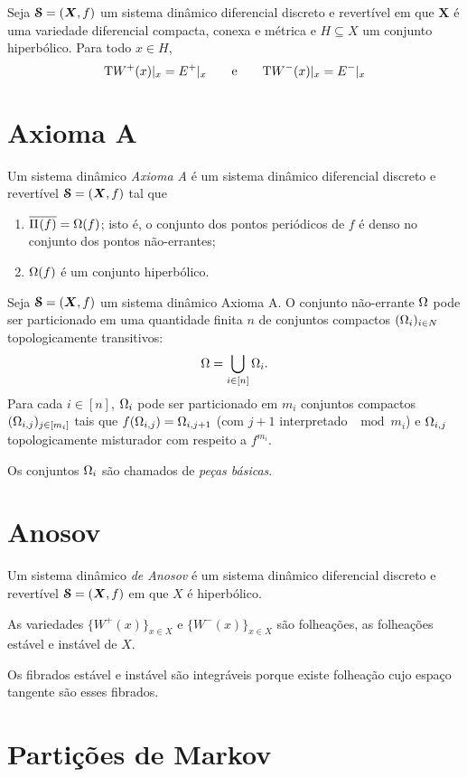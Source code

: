 \begin{proposition}
Seja $\bm{\mathcal{S}} = (\bm X,f)$ um sistema dinâmico diferencial discreto e revertível em que $\bm X$ é uma variedade diferencial compacta, conexa e métrica e $H \subseteq X$ um conjunto hiperbólico. Para todo $x \in H$,
	\begin{equation*}
	\mathrm{T} W^+(x)|_x = E^+|_x \qquad\mathrm{e}\qquad \mathrm{T} W^-(x)|_x = E^-|_x
	\end{equation*}
\end{proposition}

\section{Axioma A}

\begin{definition}
Um sistema dinâmico \emph{Axioma A} é um sistema dinâmico diferencial discreto e revertível $\bm{\mathcal{S}} = (\bm X,f)$ tal que
	\begin{enumerate}
	\item $\overline{\Pi^{}(f)} = \Omega(f)$; isto é, o conjunto dos pontos periódicos de $f$ é denso no conjunto dos pontos não-errantes;
	\item $\Omega(f)$ é um conjunto hiperbólico.
	\end{enumerate}
\end{definition}

\begin{theorem}
Seja $\bm{\mathcal{S}} = (\bm X,f)$ um sistema dinâmico Axioma A. O conjunto não-errante $\Omega$ pode ser particionado em uma quantidade finita $n$ de conjuntos compactos $(\Omega_i)_{i \in N}$ topologicamente transitivos:
	\begin{equation*}
	\Omega = \bigcup_{i \in [n]} \Omega_i.
	\end{equation*}
Para cada $i \in [n]$, $\Omega_i$ pode ser particionado em $m_i$ conjuntos compactos $(\Omega_{i,j})_{j \in [m_i]}$ tais que $f(\Omega_{i,j}) = \Omega_{i,j+1}$ (com $j+1$ interpretado $\mod m_i$) e $\Omega_{i,j}$ topologicamente misturador com respeito a $f^{m_i}$.
\end{theorem}

Os conjuntos $\Omega_i$ são chamados de \emph{peças básicas}.

\section{Anosov}

\begin{definition}
Um sistema dinâmico \emph{de Anosov} é um sistema dinâmico diferencial discreto e revertível $\bm{\mathcal{S}} = (\bm X,f)$ em que $X$ é hiperbólico.
\end{definition}


As variedades $\{W^+(x)\}_{x \in X}$ e $\{W^-(x)\}_{x \in X}$ são folheações, as folheações estável e instável de $X$.

Os fibrados estável e instável são integráveis porque existe folheação cujo espaço tangente são esses fibrados.






\section{Partições de Markov}









